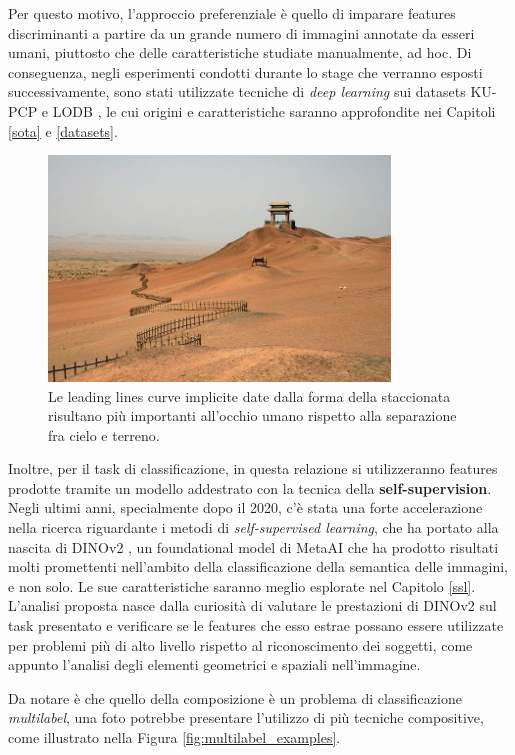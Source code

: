 Per questo motivo, l'approccio preferenziale è quello di imparare features discriminanti a partire da un grande numero di immagini annotate da esseri umani, piuttosto che delle caratteristiche studiate manualmente, ad hoc. Di conseguenza, negli esperimenti condotti durante lo stage che verranno esposti successivamente, sono stati utilizzate tecniche di \textit{deep learning} sui datasets KU-PCP \cite{KU-PCP} e LODB \cite{LODB}, le cui origini e caratteristiche saranno approfondite nei Capitoli \ref{sota} e \ref{datasets}.


\begin{figure}[b] 
    \centering
    \includegraphics[height=60mm]{Immagini/Introduzione/Stories - Lonely Planet.jpeg}
    \caption{Le leading lines curve implicite date dalla forma della staccionata risultano più importanti all'occhio umano rispetto alla separazione fra cielo e terreno.}
    \label{fig:curved_fence}
\end{figure}

Inoltre, per il task di classificazione, in questa relazione si utilizzeranno features prodotte tramite un modello addestrato con la tecnica della \textbf{self-supervision}. Negli ultimi anni, specialmente dopo il 2020, c'è stata una forte accelerazione nella ricerca riguardante i metodi di \textit{self-supervised learning}, che ha portato alla nascita di DINOv2 \cite{dinov2}, un foundational model di MetaAI che ha prodotto risultati molti promettenti nell'ambito della classificazione della semantica delle immagini, e non solo. Le sue caratteristiche saranno meglio esplorate nel Capitolo \ref{ssl}. L'analisi proposta nasce dalla curiosità di valutare le prestazioni di DINOv2 sul task presentato e verificare se le features che esso estrae possano essere utilizzate per problemi più di alto livello rispetto al riconoscimento dei soggetti, come appunto l'analisi degli elementi geometrici e spaziali nell'immagine.

Da notare è che quello della composizione è un problema di classificazione \textit{multilabel}, una foto potrebbe presentare l'utilizzo di più tecniche compositive, come illustrato nella Figura \ref{fig:multilabel_examples}.

